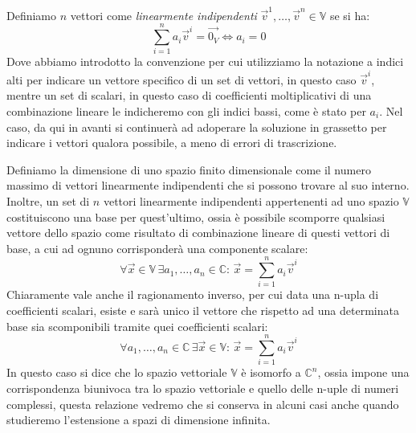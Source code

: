 Definiamo $n$ vettori come \textit{linearmente indipendenti} $\vec{v}^1,\dots,\vec{v}^n \in \mathbb{V}$ se si ha:
\begin{equation}
    \sum_{i=1}^{n} a_i \vec{v}^i = \vec{0_V} \Longleftrightarrow a_i=0
\end{equation}
Dove abbiamo introdotto la convenzione per cui utilizziamo la notazione a indici alti per indicare un vettore specifico di un set di vettori, in questo caso $\vec{v}^i$, mentre un set di scalari, in questo caso di coefficienti moltiplicativi di una combinazione lineare le indicheremo con gli indici bassi, come è stato per $a_i$. Nel caso, da qui in avanti si continuerà ad adoperare la soluzione in grassetto per indicare i vettori qualora possibile, a meno di errori di trascrizione.

Definiamo la dimensione di uno spazio finito dimensionale come il numero massimo di vettori linearmente indipendenti che si possono trovare al suo interno. Inoltre, un set di $n$ vettori linearmente indipendenti appertenenti ad uno spazio $\mathbb{V}$ costituiscono una base per quest'ultimo, ossia è possibile scomporre qualsiasi vettore dello spazio come risultato di combinazione lineare di questi vettori di base, a cui ad ognuno corrisponderà una componente scalare:
\begin{equation*}
    \forall \vec{x} \in \mathbb{V} \, \exists a_1,\dots,a_n \in \mathbb{C}: \, \vec{x}=\sum_{i=1}^{n} a_i \vec{v}^i
\end{equation*}
Chiaramente vale anche il ragionamento inverso, per cui data una n-upla di coefficienti scalari, esiste e sarà unico il vettore che rispetto ad una determinata base sia scomponibili tramite quei coefficienti scalari:
\begin{equation*}
    \forall a_1,\dots,a_n \in \mathbb{C} \, \exists \vec{x} \in \mathbb{V}: \, \vec{x}=\sum_{i=1}^{n} a_i \vec{v}^i
\end{equation*}
In questo caso si dice che lo spazio vettoriale $\mathbb{V}$ è isomorfo a $\mathbb{C}^n$, ossia impone una corrispondenza biunivoca tra lo spazio vettoriale e quello delle n-uple di numeri complessi, questa relazione vedremo che si conserva in alcuni casi anche quando studieremo l'estensione a spazi di dimensione infinita.

